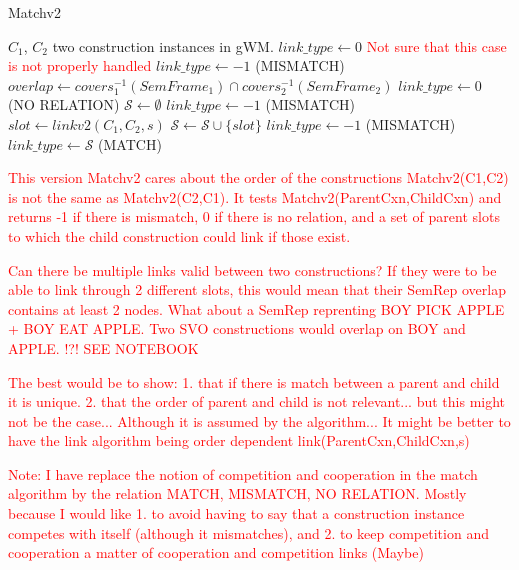 \documentclass{article}
\newcommand\todo[1]{\textcolor{red}{#1}}
\begin{document}
\begin{algorithm}[H]
\caption{Matchv2}
\label{matchv2}
\begin{algorithmic}
	\REQUIRE $C_1$, $C_2$ two construction instances in gWM.
	\STATE $link\_type \leftarrow 0$
		\STATE \todo{Not sure that this case is not properly handled}
		\RETURN $link\_type \leftarrow -1$ (MISMATCH)
	\ELSE
		\STATE $overlap \leftarrow covers_1^{-1}(SemFrame_1) \cap  covers_2^{-1}(SemFrame_2)$
			\RETURN $link\_type \leftarrow 0$ (NO RELATION)
		\ELSE
			\STATE $\mathcal{S} \leftarrow \emptyset$
					\RETURN $link\_type \leftarrow -1$ (MISMATCH)
				\ELSE
					\STATE $slot \leftarrow linkv2(C_1,C_2,s)$
						\STATE $\mathcal{S} \leftarrow \mathcal{S} \cup \lbrace slot \rbrace$
					\ENDIF
				\ENDIF
			\ENDFOR
				\RETURN $link\_type \leftarrow -1$ (MISMATCH)
			\ELSE
				\RETURN $link\_type \leftarrow \mathcal{S}$ (MATCH)
			\ENDIF
		\ENDIF
	\ENDIF
\end{algorithmic}
\end{algorithm}

\todo{This version Matchv2 cares about the order of the constructions Matchv2(C1,C2) is not the same as Matchv2(C2,C1). It tests Matchv2(ParentCxn,ChildCxn) and returns -1 if there is mismatch, 0 if there is no relation, and a set of parent slots to which the child construction could link if those exist.}

\todo{Can there be multiple links valid between two constructions? If they were to be able to link through 2 different slots, this would mean that their SemRep overlap contains at least 2 nodes. What about a SemRep reprenting BOY PICK APPLE + BOY EAT APPLE. Two SVO constructions would overlap on BOY and APPLE. !?! SEE NOTEBOOK}

\todo{The best would be to show: 1. that if there is match between a parent and child it is unique. 2. that the order of parent and child is not relevant... but this might not be the case... Although it is assumed by the algorithm... It might be better to have the link algorithm being order dependent link(ParentCxn,ChildCxn,s)}

\todo{Note: I have replace the notion of competition and cooperation in the match algorithm by the relation MATCH, MISMATCH, NO RELATION. Mostly because I would like 1. to avoid having to say that a construction instance competes with itself (although it mismatches), and 2. to keep competition and cooperation a matter of cooperation and competition links (Maybe)}
\end{document}
